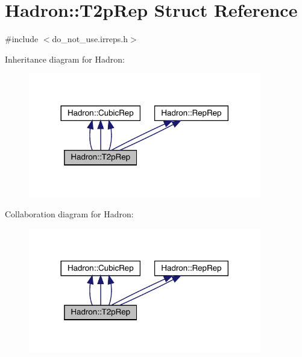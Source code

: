 \hypertarget{structHadron_1_1T2pRep}{}\section{Hadron\+:\+:T2p\+Rep Struct Reference}
\label{structHadron_1_1T2pRep}


{\ttfamily \#include $<$do\+\_\+not\+\_\+use.\+irreps.\+h$>$}



Inheritance diagram for Hadron\+:
\nopagebreak
\begin{figure}[H]
\begin{center}
\leavevmode
\includegraphics[width=288pt]{dd/dbd/structHadron_1_1T2pRep__inherit__graph}
\end{center}
\end{figure}


Collaboration diagram for Hadron\+:
\nopagebreak
\begin{figure}[H]
\begin{center}
\leavevmode
\includegraphics[width=288pt]{da/d97/structHadron_1_1T2pRep__coll__graph}
\end{center}
\end{figure}
